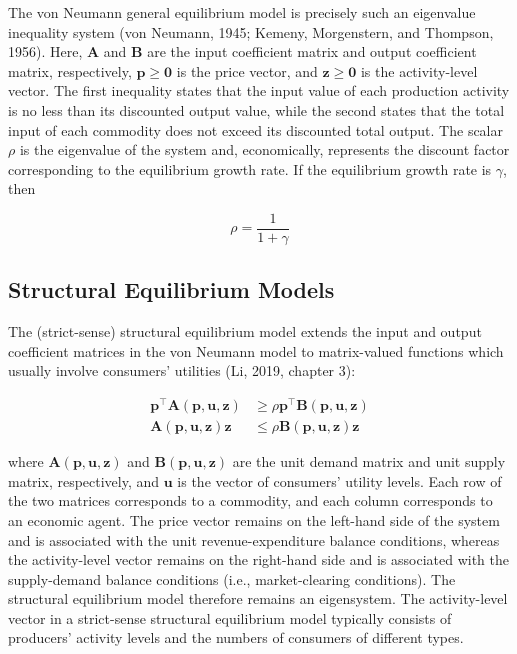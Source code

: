 \documentclass[
  letterpaper,
  DIV=11,
  numbers=noendperiod]{scrreprt}
\begin{document}
The von Neumann general equilibrium model is precisely such an
eigenvalue inequality system (von Neumann, 1945; Kemeny, Morgenstern,
and Thompson, 1956). Here, \(\mathbf A\) and \(\mathbf B\) are the input
coefficient matrix and output coefficient matrix, respectively,
\(\mathbf p\geq\mathbf 0\) is the price vector, and
\(\mathbf z\geq\mathbf 0\) is the activity-level vector. The first
inequality states that the input value of each production activity is no
less than its discounted output value, while the second states that the
total input of each commodity does not exceed its discounted total
output. The scalar \(\rho\) is the eigenvalue of the system and,
economically, represents the discount factor corresponding to the
equilibrium growth rate. If the equilibrium growth rate is \(\gamma\),
then

\[
\rho=\frac{1}{1+\gamma}
\]

\subsection{Structural Equilibrium
Models}\label{structural-equilibrium-models}

The (strict-sense) structural equilibrium model extends the input and
output coefficient matrices in the von Neumann model to matrix-valued
functions which usually involve consumers' utilities (Li, 2019, chapter
3):

\[
\begin{aligned}
\mathbf p^{\top}\mathbf A(\mathbf p,\mathbf u,\mathbf z)
&\geq
\rho\mathbf p^{\top}\mathbf B(\mathbf p,\mathbf u,\mathbf z)\\
\mathbf A(\mathbf p,\mathbf u,\mathbf z)\mathbf z
&\leq
\rho\mathbf B(\mathbf p,\mathbf u,\mathbf z)\mathbf z
\end{aligned}
\]

where \(\mathbf A(\mathbf p,\mathbf u,\mathbf z)\) and
\(\mathbf B(\mathbf p,\mathbf u,\mathbf z)\) are the unit demand matrix
and unit supply matrix, respectively, and \(\mathbf u\) is the vector of
consumers' utility levels. Each row of the two matrices corresponds to a
commodity, and each column corresponds to an economic agent. The price
vector remains on the left-hand side of the system and is associated
with the unit revenue-expenditure balance conditions, whereas the
activity-level vector remains on the right-hand side and is associated
with the supply-demand balance conditions (i.e., market-clearing
conditions). The structural equilibrium model therefore remains an
eigensystem. The activity-level vector in a strict-sense structural
equilibrium model typically consists of producers' activity levels and
the numbers of consumers of different types.
\end{document}
